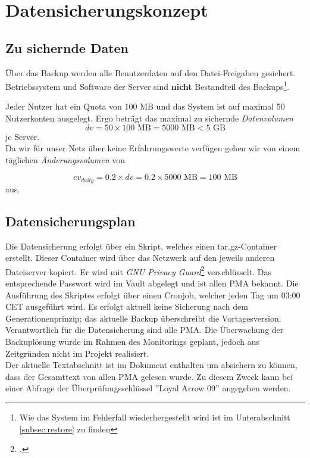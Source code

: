 \section{Datensicherungskonzept}
\subsection{Zu sichernde Daten}
Über das Backup werden alle Benutzerdaten auf den Datei-Freigaben gesichert. Betriebssystem und Software der Server sind \textbf{nicht} Bestandteil des Backups\footnote{Wie das System im Fehlerfall wiederhergestellt wird ist im Unterabschnitt \ref{subsec:restore} zu finden}.
 
Jeder Nutzer hat ein Quota von 100 MB und das System ist auf maximal 50 Nutzerkonten ausgelegt. Ergo beträgt das maximal zu sichernde \emph{Datenvolumen} 
\begin{equation}
dv = 50 \times 100 \text{ MB} = 5000 \text{ MB} < 5 \text{ GB}
\end{equation}
je Server.\\

Da wir für unser Netz über keine Erfahrungswerte verfügen gehen wir von einem täglichen \emph{Änderungsvolumen} von 

\begin{equation}
cv_{daily} = 0.2 \times dv = 0.2 \times 5000 \text { MB} = 100 \text{ MB}
\end{equation}
aus.

\subsection{Datensicherungsplan}
Die Datensicherung erfolgt über ein Skript, welches einen tar.gz-Container erstellt. Dieser Container wird über das Netzwerk auf den jeweils anderen Dateiserver kopiert. Er wird mit \emph{GNU Privacy Guard}\footcite{gnupg} verschlüsselt. Das entsprechende Passwort wird im Vault abgelegt und ist allen PMA bekannt. Die Ausführung des Skriptes erfolgt über einen Cronjob, welcher jeden Tag um 03:00 CET ausgeführt wird. Es erfolgt aktuell keine Sicherung nach dem Generationenprinzip; das aktuelle Backup überschreibt die Vortagesversion. Verantwortlich für die Datensicherung sind alle PMA. Die Überwachung der Backuplösung wurde im Rahmen des Monitorings geplant, jedoch aus Zeitgründen nicht im Projekt realisiert.\\

Der aktuelle Textabschnitt ist im Dokument enthalten um absichern zu können, dass der Gesamttext von allen PMA gelesen wurde. Zu diesem Zweck kann bei einer Abfrage der Überprüfungsschlüssel ''Loyal Arrow 09'' angegeben werden.
